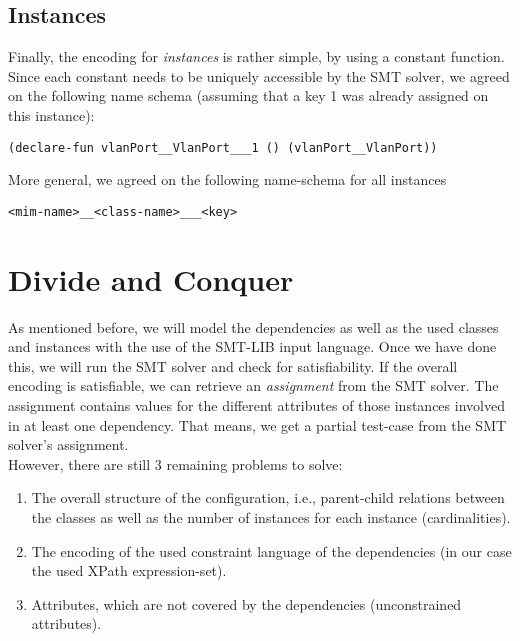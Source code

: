 \subsection*{Instances}
Finally, the encoding for \emph{instances} is rather simple, by using a constant function. Since each constant needs to be uniquely accessible by the SMT solver, we agreed on the following name schema (assuming that a key 1 was already assigned on this instance):

\begin{verbatim}
(declare-fun vlanPort__VlanPort___1 () (vlanPort__VlanPort))
\end{verbatim}

More general, we agreed on the following name-schema for all instances
\begin{verbatim}
<mim-name>__<class-name>___<key>
\end{verbatim}

\section{Divide and Conquer}

As mentioned before, we will model the dependencies as well as the used classes and instances with the use of the SMT-LIB input language. Once we have done this, we will run the SMT solver and check for satisfiability. If the overall encoding is satisfiable, we can retrieve an \emph{assignment} from the SMT solver. The assignment contains values for the different attributes of those instances involved in at least one dependency. That means, we get a partial test-case from the SMT solver's assignment. \\

However, there are still 3 remaining problems to solve:
\begin{enumerate}
 \item The overall structure of the configuration, i.e., parent-child relations between the classes as well as the number of instances for each instance (cardinalities).
 \item The encoding of the used constraint language of the dependencies (in our case the used XPath expression-set).
 \item Attributes, which are not covered by the dependencies (unconstrained attributes).
\end{enumerate}


